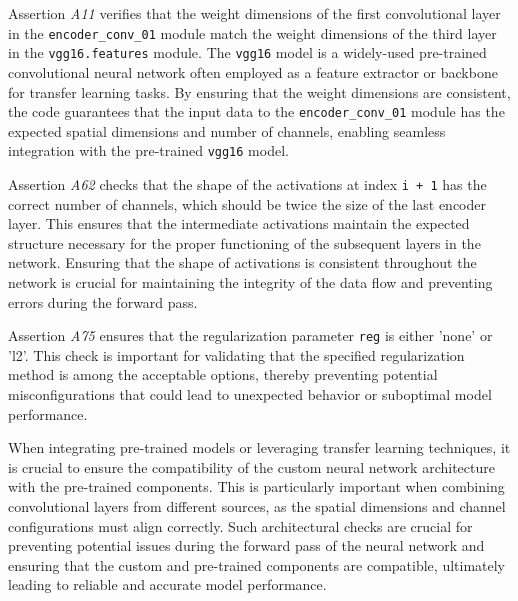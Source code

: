 Assertion \emph{A11} verifies that the weight dimensions of the first convolutional layer in the \lstinline{encoder_conv_01} module match the weight dimensions of the third layer in the \lstinline{vgg16.features} module. The \lstinline{vgg16} model is a widely-used pre-trained convolutional neural network often employed as a feature extractor or backbone for transfer learning tasks. By ensuring that the weight dimensions are consistent, the code guarantees that the input data to the \lstinline{encoder_conv_01} module has the expected spatial dimensions and number of channels, enabling seamless integration with the pre-trained \lstinline{vgg16} model.

Assertion \emph{A62} checks that the shape of the activations at index \lstinline{i + 1} has the correct number of channels, which should be twice the size of the last encoder layer. This ensures that the intermediate activations maintain the expected structure necessary for the proper functioning of the subsequent layers in the network. Ensuring that the shape of activations is consistent throughout the network is crucial for maintaining the integrity of the data flow and preventing errors during the forward pass.

Assertion \emph{A75} ensures that the regularization parameter \lstinline{reg} is either 'none' or 'l2'. This check is important for validating that the specified regularization method is among the acceptable options, thereby preventing potential misconfigurations that could lead to unexpected behavior or suboptimal model performance.

When integrating pre-trained models or leveraging transfer learning techniques, it is crucial to ensure the compatibility of the custom neural network architecture with the pre-trained components. This is particularly important when combining convolutional layers from different sources, as the spatial dimensions and channel configurations must align correctly. Such architectural checks are crucial for preventing potential issues during the forward pass of the neural network and ensuring that the custom and pre-trained components are compatible, ultimately leading to reliable and accurate model performance.



